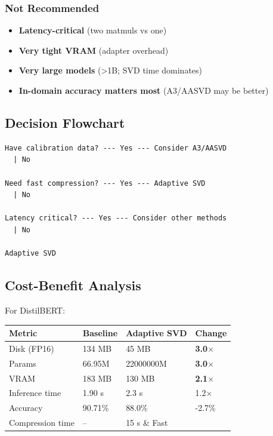 \subsubsection{Not Recommended}

\begin{itemize}
\item \textbf{Latency-critical} (two matmuls vs one)
\item \textbf{Very tight VRAM} (adapter overhead)
\item \textbf{Very large models} (>1B; SVD time dominates)
\item \textbf{In-domain accuracy matters most} (A3/AASVD may be better)

\end{itemize}
\subsection{Decision Flowchart}

\begin{lstlisting}
Have calibration data? --- Yes --- Consider A3/AASVD
  | No
   
Need fast compression? --- Yes --- Adaptive SVD
  | No
   
Latency critical? --- Yes --- Consider other methods
  | No
   
Adaptive SVD
\end{lstlisting}

\subsection{Cost-Benefit Analysis}

For DistilBERT:

\begin{table}[H]
\centering
\small
\begin{tabular}{llll}
\toprule
\textbf{Metric} & \textbf{Baseline} & \textbf{Adaptive SVD} & \textbf{Change} \\
\midrule
Disk (FP16) & 134 MB & 45 MB & \textbf{3.0$\times$} \\
Params & 66.95M & 22000000M & \textbf{3.0$\times$} \\
VRAM & 183 MB & 130 MB & \textbf{2.1$\times$} \\
Inference time & 1.90 s & 2.3 s & 1.2$\times$ \\
Accuracy & 90.71\% & 88.0\% & -2.7\% \\
Compression time & -- & 15 s \& Fast \\
\bottomrule
\end{tabular}
\end{table}

